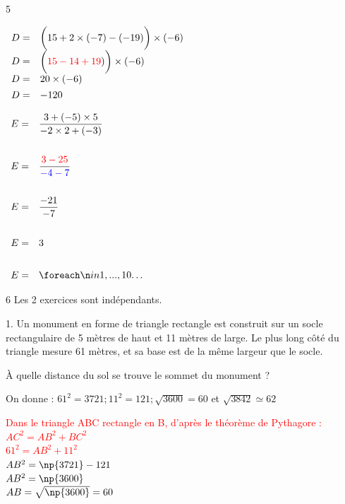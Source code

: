 \documentclass[a4paper]{book}
\begin{document}
{\begin{exerciceNote}{5}
\begin{minipage}{0.30\linewidth}
            $\begin{array}{ll}
                D = & \bigg(15+2\times(-7)-(-19)\bigg)\times(-6) \\[1ex]
                D = & \bigg(\textcolor{red}{15-14+19})\bigg)\times(-6)\\[1ex]
                D = & 20\times(-6)\\[1ex]
                D = & -120
            \end{array}$
        \end{minipage}
        \hfill
        \begin{minipage}[t]{0.30\linewidth}
            $\begin{array}{ll}
                E = & \dfrac{3+(-5)\times5}{-2\times2+(-3)} \\ \\[2ex]
                E = & \dfrac{\textcolor{red}{3-25}}{\textcolor{blue}{-4-7}} \\ \\[2ex]
                E = & \dfrac{-21}{-7} \\ \\[2ex]
                E = & 3 \\ \\[2ex]
                E = & \points[10] 
            \end{array}$
        \end{minipage}
    \end{exerciceNote}


    \begin{exerciceNote}{6}
        Les 2 exercices sont indépendants.
        
        \begin{minipage}{0.7\linewidth}
            1. Un monument en forme de triangle rectangle est construit sur un socle rectangulaire de 5 mètres de haut et 11 mètres de large. Le plus long côté du triangle mesure 61 mètres, et sa base est de la même largeur que le socle.

            \medskip

            À quelle distance du sol se trouve le sommet du monument ? 

            On donne : $61^2=3721; 11^2=121; \sqrt{3600}=60$ et $\sqrt{3842}\simeq62$

            \bigskip

            \textcolor{red}{Dans le triangle ABC rectangle en B, d'après le théorème de Pythagore :\\
            $AC^2=AB^2+BC^2$\\
            $61^2=AB^2+11^2$\\
            $AB^2=\np{3721}-121$\\
            $AB^2=\np{3600}$\\
            $AB=\sqrt{\np{3600}}=60$}


\end{minipage}
\end{exerciceNote}}
\end{document}
